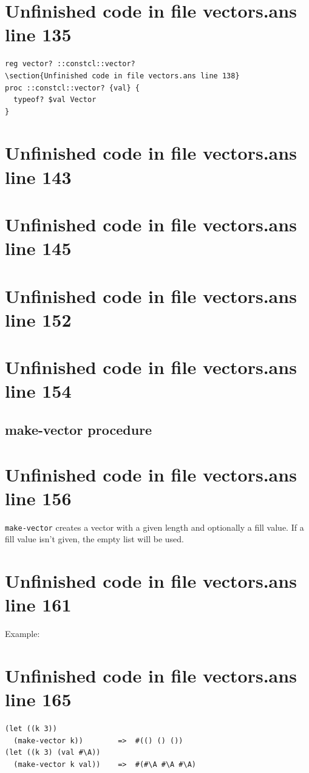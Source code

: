 \documentclass[twoside,9pt]{report}
\begin{document}
\section{Unfinished code in file vectors.ans line 135}
\begin{lstlisting}
reg vector? ::constcl::vector?
\section{Unfinished code in file vectors.ans line 138}
proc ::constcl::vector? {val} {
  typeof? $val Vector
}
\end{lstlisting}
\section{Unfinished code in file vectors.ans line 143}
\section{Unfinished code in file vectors.ans line 145}
\section{Unfinished code in file vectors.ans line 152}
\section{Unfinished code in file vectors.ans line 154}
\subsection{make-vector procedure}
\label{make-vector-procedure}
\section{Unfinished code in file vectors.ans line 156}


\texttt{make-vector} creates a vector with a given length and optionally a fill value. If a fill value isn't given, the empty list will be used.

\section{Unfinished code in file vectors.ans line 161}


Example:

\section{Unfinished code in file vectors.ans line 165}
\begin{verbatim}
(let ((k 3))
  (make-vector k))        =>  #(() () ())
(let ((k 3) (val #\A))
  (make-vector k val))    =>  #(#\A #\A #\A)
\end{verbatim}
\end{document}
